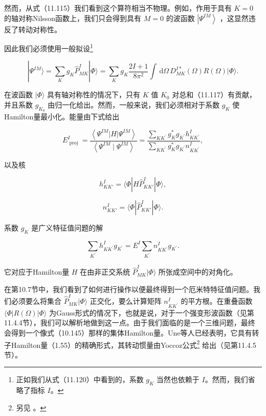 然而，从式（11.115）我们看到这个算符相当不物理。例如，作用于具有 $K=0$ 的轴对称Nilsson函数上，我们只会得到具有
$M=0$ 的波函数 $\left|{\Psi}^{IM}\right\rangle $ ，这显然违反了转动对称性。

因此我们必须使用一般拟设\footnote{正如我们从式（11.120）中看到的，系数 $g_{K}$ 当然也依赖于 $I$。然而，我们省略了指标 $I$。}

\[
|\Psi^{IM}\rangle=\mathop{\sum}\limits_{K}g_{K}\widehat{P}^{I}_{MK}|\Phi\rangle=\mathop{\sum}\limits_{K}g_{K}\frac{2I+1}{8\pi^{2}}\int\,\mathrm{d}\Omega\,D^{I*}_{MK}(\Omega)R(\Omega)|\Phi\rangle.\tag{11.117}
\]

在波函数 $|\Phi\rangle$ 具有轴对称性的情况下，只有 $K$ 值 ${K}_{0}$ 对总和（11.117）有贡献，并且系数
${g}_{{K}_{0}}$ 由归一化给出。然而，一般来说，我们必须相对于系数 ${g}_{K}$ 使Hamilton量最小化。能量由下式给出

\[
{E}^{I}_{\text{ proj }}=\frac{\left\langle {\Psi}^{IM}\left|H\right|{\Psi}^{IM}\right\rangle }{\left\langle {\Psi}^{IM}\mid{\Psi}^{IM}\right\rangle }=\frac{\mathop{\sum}\limits_{{K{K}^{\prime}}}{g}^{*}_{K}{g}_{{K}^{\prime}}{h}^{I}_{K{K}^{\prime}}}{\mathop{\sum}\limits_{{K{K}^{\prime}}}{g}^{*}_{K}{g}_{{K}^{\prime}}{n}^{I}_{K{K}^{\prime}}},\tag{11.118}
\]

以及核

\[
h^{I}_{KK'}=\langle\Phi|H\hat{P}^{I}_{KK'}|\Phi\rangle,
\]

\[
n^{I}_{KK'}=\langle\Phi|\hat{P}^{I}_{KK'}|\Phi\rangle.\tag{11.119}
\]

系数 ${g}_{K}$ 是广义特征值问题的解

\[
\mathop{\sum}\limits_{{K}^{\prime}}{h}^{I}_{K{K}^{\prime}}{g}_{{K}^{\prime}}={E}^{I}\mathop{\sum}\limits_{{K}^{\prime}}{n}^{I}_{K{K}^{\prime}}{g}_{{K}^{\prime}}.\tag{11.120}
\]

它对应于Hamilton量 $H$ 在由非正交系统 ${\widehat{P}}^{I}_{MK}|\Phi\rangle$ 所张成空间中的对角化。

在第10.7节中，我们看到了如何进行操作以便最终得到一个厄米特特征值问题。我们必须要么将集合 ${\widehat{P}}^{I}_{MK}|\Phi\rangle$
正交化，要么计算矩阵 ${n}^{I}_{K{K}^{\prime}}$ 的平方根。在重叠函数 $\langle\Phi\left|{R\left(\Omega\right)}\right|\Phi\rangle$
为Gauss形式的情况下，也就是说，对于一个强变形波函数（见第11.4.4节），我们可以解析地做到这一点。由于我们面临的是一个三维问题，最终会得到一个像式（10.145）那样的集体Hamilton量。Une等人\cite{UIO76}已经表明，它具有转子Hamilton量（1.55）的精确形式，其转动惯量由Yoccoz公式\footnote{另见 \cite{ABC77a}。}
给出（见第11.4.5节）。

